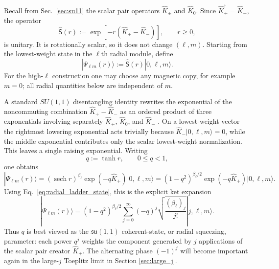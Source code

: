 \documentclass[11pt]{article}
\numberwithin{equation}{section}
\theoremstyle{definition}
\begin{document}
Recall from Sec.~\ref{sec:su11} the scalar pair operators
$\widehat K_\pm$ and $\widehat K_0$.  Since
$\widehat K_+^\dagger=\widehat K_-$, the operator
\begin{equation}
 \widehat{\mathsf S}(r)
 :=\exp\!\left[-r(\widehat K_+-\widehat K_-)\right],
 \qquad r\ge0,
 \label{eq:radial_squeeze_operator}
\end{equation}
is unitary.  It is rotationally scalar, so it does not change $(\ell,m)$.
Starting from the lowest-weight state in the $\ell$th radial module, define
\begin{equation}
 |\Psi_{\ell m}(r)\rangle
 :=\widehat{\mathsf S}(r)|0,\ell,m\rangle .
 \label{eq:squeezed_radial_ket}
\end{equation}
For the high-$\ell$ construction one may choose any magnetic copy, for example
$m=0$; all radial quantities below are independent of $m$.

A standard $SU(1,1)$ disentangling identity rewrites the exponential of the
noncommuting combination $\widehat K_+-\widehat K_-$ as an ordered product of
three exponentials involving separately $\widehat K_+$, $\widehat K_0$, and
$\widehat K_-$ \cite{Perelomov1986}.  On a lowest-weight vector the rightmost
lowering exponential acts trivially because
$\widehat K_-|0,\ell,m\rangle=0$, while the middle exponential contributes only
the scalar lowest-weight normalization.  This leaves a single raising
exponential.  Writing
\begin{equation}
 q:=\tanh r,\qquad 0\le q<1,
 \label{eq:squeeze_disk_parameter}
\end{equation}
one obtains
\begin{equation}
 |\Psi_{\ell m}(r)\rangle
 =(\operatorname{sech} r)^{\beta_\ell}
 \exp(-q\widehat K_+)|0,\ell,m\rangle
 =(1-q^2)^{\beta_\ell/2}
 \exp(-q\widehat K_+)|0,\ell,m\rangle .
 \label{eq:squeeze_disentangled}
\end{equation}
Using Eq.~\eqref{eq:radial_ladder_state}, this is the explicit ket expansion
\begin{equation}
 \boxed{
 |\Psi_{\ell m}(r)\rangle
 =(1-q^2)^{\beta_\ell/2}
 \sum_{j=0}^{\infty}
 (-q)^j
 \sqrt{\frac{(\beta_\ell)_j}{j!}}
 |j,\ell,m\rangle .
 }
 \label{eq:squeezed_ket_expansion}
\end{equation}
Thus $q$ is best viewed as the $\mathfrak{su}(1,1)$ coherent-state, or radial squeezing,
parameter: each power $q^j$ weights the component generated by $j$
applications of the scalar pair creator $\widehat K_+$.  The alternating
phase $(-1)^j$ will become important again in the large-$j$ Toeplitz limit in Section \ref{sec:large_j}.
\end{document}
